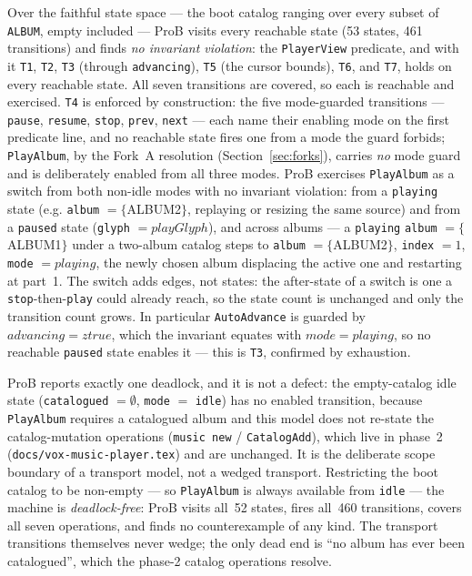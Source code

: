 \documentclass[a4paper,10pt,fleqn]{article}
\begin{document}
Over the faithful state space --- the boot catalog ranging over every subset of
\texttt{ALBUM}, empty included --- ProB visits every reachable state (53 states,
461 transitions) and finds \emph{no invariant violation}: the \texttt{PlayerView}
predicate, and with it \texttt{T1}, \texttt{T2}, \texttt{T3} (through
\texttt{advancing}), \texttt{T5} (the cursor bounds), \texttt{T6}, and
\texttt{T7}, holds on every reachable state. All seven transitions are covered,
so each is reachable and exercised. \texttt{T4} is enforced by construction: the
five mode-guarded transitions --- \texttt{pause}, \texttt{resume}, \texttt{stop},
\texttt{prev}, \texttt{next} --- each name their enabling mode on the first
predicate line, and no reachable state fires one from a mode the guard forbids;
\texttt{PlayAlbum}, by the Fork~A resolution (Section~\ref{sec:forks}), carries
\emph{no} mode guard and is deliberately enabled from all three modes. ProB
exercises \texttt{PlayAlbum} as a switch from both non-idle modes with no
invariant violation: from a \texttt{playing} state (e.g. \texttt{album} $=
\{$ALBUM2$\}$, replaying or resizing the same source) and from a \texttt{paused}
state (\texttt{glyph} $= playGlyph$), and across albums --- a \texttt{playing}
\texttt{album} $= \{$ALBUM1$\}$ under a two-album catalog steps to
\texttt{album} $= \{$ALBUM2$\}$, \texttt{index} $= 1$, \texttt{mode} $=
playing$, the newly chosen album displacing the active one and restarting at
part~1. The switch adds edges, not states: the after-state of a switch is one a
\texttt{stop}-then-\texttt{play} could already reach, so the state count is
unchanged and only the transition count grows. In particular \texttt{AutoAdvance}
is guarded by $advancing = ztrue$, which the invariant equates with $mode =
playing$, so no reachable \texttt{paused} state enables it --- this is
\texttt{T3}, confirmed by exhaustion.

ProB reports exactly one deadlock, and it is not a defect: the empty-catalog
idle state (\texttt{catalogued} $= \emptyset$, \texttt{mode} $=$ \texttt{idle})
has no enabled transition, because \texttt{PlayAlbum} requires a catalogued
album and this model does not re-state the catalog-mutation operations
(\texttt{music new} / \texttt{CatalogAdd}), which live in phase~2
(\texttt{docs/vox-music-player.tex}) and are unchanged. It is the deliberate
scope boundary of a transport model, not a wedged transport. Restricting the
boot catalog to be non-empty --- so \texttt{PlayAlbum} is always available from
\texttt{idle} --- the machine is \emph{deadlock-free}: ProB visits all~52 states,
fires all~460 transitions, covers all seven operations, and finds no
counterexample of any kind. The transport transitions themselves never wedge;
the only dead end is ``no album has ever been catalogued'', which the phase-2
catalog operations resolve.
\end{document}
